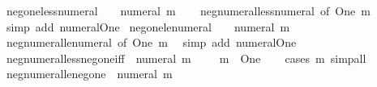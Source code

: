 \begin{isabellebody}
\endisatagproof
{\isafoldproof}%
%
\isadelimproof
\isanewline
%
\endisadelimproof
\isanewline
{}\isamarkupfalse%
\ neg{\isacharunderscore}{\kern0pt}one{\isacharunderscore}{\kern0pt}less{\isacharunderscore}{\kern0pt}numeral{\isacharcolon}{\kern0pt}\ {\isachardoublequoteopen}{\isacharminus}{\kern0pt}\ {}\ {\isacharless}{\kern0pt}\ numeral\ m{\isachardoublequoteclose}\isanewline
%
\isadelimproof
\ \ %
\endisadelimproof
%
\isatagproof
{}\isamarkupfalse%
\ neg{\isacharunderscore}{\kern0pt}numeral{\isacharunderscore}{\kern0pt}less{\isacharunderscore}{\kern0pt}numeral\ {\isacharbrackleft}{\kern0pt}of\ One\ m{\isacharbrackright}{\kern0pt}\ \isamarkupfalse%
\ {\isacharparenleft}{\kern0pt}simp\ add{\isacharcolon}{\kern0pt}\ numeral{\isacharunderscore}{\kern0pt}One{\isacharparenright}{\kern0pt}%
\endisatagproof
{\isafoldproof}%
%
\isadelimproof
\isanewline
%
\endisadelimproof
\isanewline
{}\isamarkupfalse%
\ neg{\isacharunderscore}{\kern0pt}one{\isacharunderscore}{\kern0pt}le{\isacharunderscore}{\kern0pt}numeral{\isacharcolon}{\kern0pt}\ {\isachardoublequoteopen}{\isacharminus}{\kern0pt}\ {}\ {\isasymle}\ numeral\ m{\isachardoublequoteclose}\isanewline
%
\isadelimproof
\ \ %
\endisadelimproof
%
\isatagproof
{}\isamarkupfalse%
\ neg{\isacharunderscore}{\kern0pt}numeral{\isacharunderscore}{\kern0pt}le{\isacharunderscore}{\kern0pt}numeral\ {\isacharbrackleft}{\kern0pt}of\ One\ m{\isacharbrackright}{\kern0pt}\ \isamarkupfalse%
\ {\isacharparenleft}{\kern0pt}simp\ add{\isacharcolon}{\kern0pt}\ numeral{\isacharunderscore}{\kern0pt}One{\isacharparenright}{\kern0pt}%
\endisatagproof
{\isafoldproof}%
%
\isadelimproof
\isanewline
%
\endisadelimproof
\isanewline
{}\isamarkupfalse%
\ neg{\isacharunderscore}{\kern0pt}numeral{\isacharunderscore}{\kern0pt}less{\isacharunderscore}{\kern0pt}neg{\isacharunderscore}{\kern0pt}one{\isacharunderscore}{\kern0pt}iff{\isacharcolon}{\kern0pt}\ {\isachardoublequoteopen}{\isacharminus}{\kern0pt}\ numeral\ m\ {\isacharless}{\kern0pt}\ {\isacharminus}{\kern0pt}\ {}\ {\isasymlongleftrightarrow}\ m\ {\isasymnoteq}\ One{\isachardoublequoteclose}\isanewline
%
\isadelimproof
\ \ %
\endisadelimproof
%
\isatagproof
{}\isamarkupfalse%
\ {\isacharparenleft}{\kern0pt}cases\ m{\isacharparenright}{\kern0pt}\ simp{\isacharunderscore}{\kern0pt}all%
\endisatagproof
{\isafoldproof}%
%
\isadelimproof
\isanewline
%
\endisadelimproof
\isanewline
{}\isamarkupfalse%
\ neg{\isacharunderscore}{\kern0pt}numeral{\isacharunderscore}{\kern0pt}le{\isacharunderscore}{\kern0pt}neg{\isacharunderscore}{\kern0pt}one{\isacharcolon}{\kern0pt}\ {\isachardoublequoteopen}{\isacharminus}{\kern0pt}\ numeral\ m\ {\isasymle}\ {\isacharminus}{\kern0pt}\ {}{\isachardoublequoteclose}\isanewline

\end{isabellebody}
